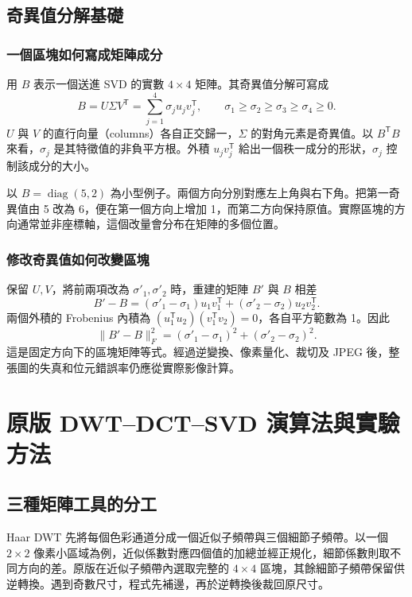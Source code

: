 \documentclass[12pt,a4paper,onecolumn]{article}
\begin{document}
\subsection{奇異值分解基礎}

\subsubsection{一個區塊如何寫成矩陣成分}
用 \(B\) 表示一個送進 SVD 的實數 \(4\times4\) 矩陣。其奇異值分解可寫成
\[
 B=U\Sigma V^{\mathsf T}
  =\sum_{j=1}^{4}\sigma_j u_jv_j^{\mathsf T},\qquad
 \sigma_1\ge \sigma_2\ge \sigma_3\ge \sigma_4\ge0.
\]
\(U\) 與 \(V\) 的直行向量（columns）各自正交歸一，\(\Sigma\) 的對角元素是奇異值。以 \(B^{\mathsf T}B\) 來看，\(\sigma_j\) 是其特徵值的非負平方根。外積 \(u_jv_j^{\mathsf T}\) 給出一個秩一成分的形狀，\(\sigma_j\) 控制該成分的大小。

以 \(B=\operatorname{diag}(5,2)\) 為小型例子。兩個方向分別對應左上角與右下角。把第一奇異值由 5 改為 6，便在第一個方向上增加 1，而第二方向保持原值。實際區塊的方向通常並非座標軸，這個改量會分布在矩陣的多個位置。

\subsubsection{修改奇異值如何改變區塊}
保留 \(U,V\)，將前兩項改為 \(\sigma'_1,\sigma'_2\) 時，重建的矩陣 \(B'\) 與 \(B\) 相差
\[
 B'-B=(\sigma'_1-\sigma_1)u_1v_1^{\mathsf T}
     +(\sigma'_2-\sigma_2)u_2v_2^{\mathsf T}.
\]
兩個外積的 Frobenius 內積為
\((u_1^{\mathsf T}u_2)(v_1^{\mathsf T}v_2)=0\)，各自平方範數為 1。因此
\[
 \|B'-B\|_F^2=(\sigma'_1-\sigma_1)^2+(\sigma'_2-\sigma_2)^2.
\]
這是固定方向下的區塊矩陣等式。經過逆變換、像素量化、裁切及 JPEG 後，整張圖的失真和位元錯誤率仍應從實際影像計算。

\section{原版 DWT–DCT–SVD 演算法與實驗方法}

\subsection{三種矩陣工具的分工}
Haar DWT 先將每個色彩通道分成一個近似子頻帶與三個細節子頻帶。以一個 \(2\times2\) 像素小區域為例，近似係數對應四個值的加總並經正規化，細節係數則取不同方向的差。原版在近似子頻帶內選取完整的 \(4\times4\) 區塊，其餘細節子頻帶保留供逆轉換。遇到奇數尺寸，程式先補邊，再於逆轉換後裁回原尺寸。
\end{document}
